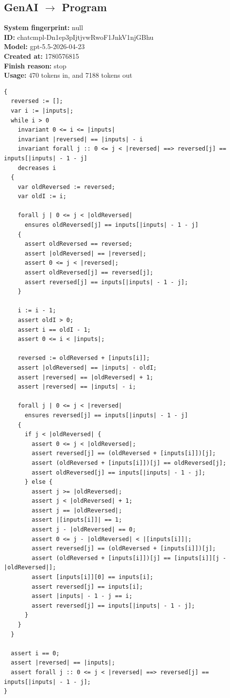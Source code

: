 \documentclass{article}
\begin{document}
\subsection*{GenAI $\rightarrow$ Program}
\textbf{System fingerprint: }null
\\\textbf{ID: }chatcmpl-Dn1ep3pIjtjvwRwoF1JnkV1njGBhu
\\\textbf{Model: }gpt-5.5-2026-04-23
\\\textbf{Created at: }1780576815
\\\textbf{Finish reason: }stop
\\\textbf{Usage: }470 tokens in, and 7188 tokens out
\begin{lstlisting}
{
  reversed := [];
  var i := |inputs|;
  while i > 0
    invariant 0 <= i <= |inputs|
    invariant |reversed| == |inputs| - i
    invariant forall j :: 0 <= j < |reversed| ==> reversed[j] == inputs[|inputs| - 1 - j]
    decreases i
  {
    var oldReversed := reversed;
    var oldI := i;

    forall j | 0 <= j < |oldReversed|
      ensures oldReversed[j] == inputs[|inputs| - 1 - j]
    {
      assert oldReversed == reversed;
      assert |oldReversed| == |reversed|;
      assert 0 <= j < |reversed|;
      assert oldReversed[j] == reversed[j];
      assert reversed[j] == inputs[|inputs| - 1 - j];
    }

    i := i - 1;
    assert oldI > 0;
    assert i == oldI - 1;
    assert 0 <= i < |inputs|;

    reversed := oldReversed + [inputs[i]];
    assert |oldReversed| == |inputs| - oldI;
    assert |reversed| == |oldReversed| + 1;
    assert |reversed| == |inputs| - i;

    forall j | 0 <= j < |reversed|
      ensures reversed[j] == inputs[|inputs| - 1 - j]
    {
      if j < |oldReversed| {
        assert 0 <= j < |oldReversed|;
        assert reversed[j] == (oldReversed + [inputs[i]])[j];
        assert (oldReversed + [inputs[i]])[j] == oldReversed[j];
        assert oldReversed[j] == inputs[|inputs| - 1 - j];
      } else {
        assert j >= |oldReversed|;
        assert j < |oldReversed| + 1;
        assert j == |oldReversed|;
        assert |[inputs[i]]| == 1;
        assert j - |oldReversed| == 0;
        assert 0 <= j - |oldReversed| < |[inputs[i]]|;
        assert reversed[j] == (oldReversed + [inputs[i]])[j];
        assert (oldReversed + [inputs[i]])[j] == [inputs[i]][j - |oldReversed|];
        assert [inputs[i]][0] == inputs[i];
        assert reversed[j] == inputs[i];
        assert |inputs| - 1 - j == i;
        assert reversed[j] == inputs[|inputs| - 1 - j];
      }
    }
  }

  assert i == 0;
  assert |reversed| == |inputs|;
  assert forall j :: 0 <= j < |reversed| ==> reversed[j] == inputs[|inputs| - 1 - j];
}
\end{lstlisting}
\end{document}

